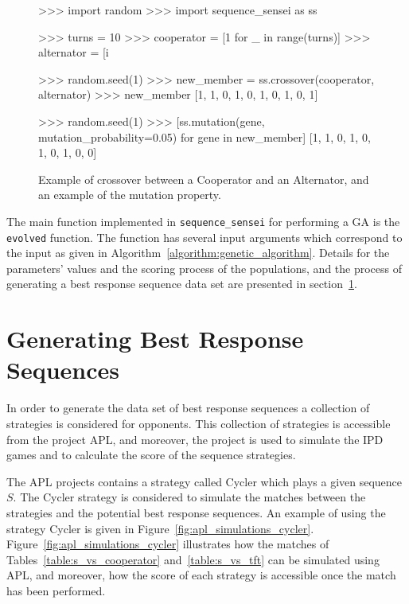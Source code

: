 \begin{figure}[!htbp]
\begin{usagepy}
>>> import random
>>> import sequence_sensei as ss

>>> turns = 10
>>> cooperator = [1 for _ in range(turns)]
>>> alternator = [i %

>>> random.seed(1)
>>> new_member = ss.crossover(cooperator, alternator)
>>> new_member
[1, 1, 0, 1, 0, 1, 0, 1, 0, 1]

>>> random.seed(1)
>>> [ss.mutation(gene, mutation_probability=0.05) for gene in new_member]
[1, 1, 0, 1, 0, 1, 0, 1, 0, 0]

\end{usagepy}
\caption{Example of crossover between a Cooperator and an Alternator, and an example
of the mutation property.}\label{fig:crossover_mutation}
\end{figure}

The main function implemented in \texttt{sequence_sensei} for
performing a GA is the \texttt{evolved} function. The function has
several input arguments which correspond to the input as given in
Algorithm~\ref{algorithm:genetic_algorithm}. Details for the parameters' values
and the scoring process of the populations, and the process of generating a best
response sequence data set are presented in
section~\ref{section:generating_sequences}.

\section{Generating Best Response Sequences}\label{section:generating_sequences}

In order to generate the data set of best response sequences a collection of
\numberofstrategiesbestsequences strategies is considered for opponents. This
collection of strategies is accessible from the project APL, and moreover,
the project is used to simulate the IPD games and to calculate the score
of the sequence strategies.

The APL projects contains a strategy called Cycler which plays a given sequence
\(S\). The Cycler strategy is considered to simulate the matches between the
\numberofstrategiesbestsequences strategies and the potential best response
sequences. An example of using the strategy Cycler is given in
Figure~\ref{fig:apl_simulations_cycler}. Figure~\ref{fig:apl_simulations_cycler}
illustrates how the matches of Tables~\ref{table:s_vs_cooperator}
and~\ref{table:s_vs_tft} can be simulated using APL, and moreover, how the score
of each strategy is accessible once the match has been performed.

